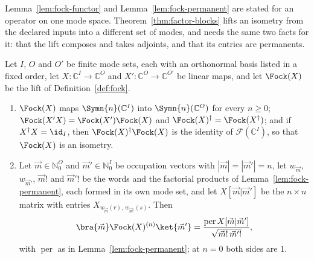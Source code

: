 
Lemma~\ref{lem:fock-functor} and Lemma~\ref{lem:fock-permanent} are stated for
an operator on one mode space. Theorem~\ref{thm:factor-blocks} lifts an
isometry from the declared inputs into a different set of modes, and needs the
same two facts for it: that the lift composes and takes adjoints, and that its
entries are permanents.

\begin{lemma}\label{lem:fock-permanent-maps}
Let $I$, $O$ and $O'$ be finite mode sets, each with an orthonormal basis
listed in a fixed order, let $X:\mathbb{C}^{I}\to\mathbb{C}^{O}$ and
$X':\mathbb{C}^{O}\to\mathbb{C}^{O'}$ be linear maps, and let $\Fock(X)$ be
the lift of Definition~\ref{def:fock}.
\begin{enumerate}[label=(\roman*),leftmargin=3.0em]
\item $\Fock(X)$ maps $\Symn{n}(\mathbb{C}^{I})$ into
  $\Symn{n}(\mathbb{C}^{O})$ for every $n\ge0$;
  $\Fock(X'X)=\Fock(X')\Fock(X)$ and $\Fock(X)^{\dagger}=\Fock(X^{\dagger})$;
  and if $X^{\dagger}X=\id_{I}$, then $\Fock(X)^{\dagger}\Fock(X)$ is the
  identity of $\mathcal{F}(\mathbb{C}^{I})$, so that $\Fock(X)$ is an
  isometry.
\item Let $\vec m\in\mathbb{N}_0^{O}$ and $\vec m'\in\mathbb{N}_0^{I}$ be
  occupation vectors with $|\vec m|=|\vec m'|=n$, let $w_{\vec m}$,
  $w_{\vec m'}$, $\vec m!$ and $\vec m'!$ be the words and the factorial
  products of Lemma~\ref{lem:fock-permanent}, each formed in its own mode set,
  and let $X[\vec m|\vec m']$ be the $n\times n$ matrix with entries
  $X_{w_{\vec m}(r),\,w_{\vec m'}(s)}$. Then
  \begin{equation}\label{eq:fock-permanent-maps}
    \bra{\vec m}\Fock(X)^{(n)}\ket{\vec m'}
    =\frac{\operatorname{per}X[\vec m|\vec m']}{\sqrt{\vec m!\,\vec m'!}} ,
  \end{equation}
  with $\operatorname{per}$ as in Lemma~\ref{lem:fock-permanent}; at $n=0$
  both sides are $1$.
\end{enumerate}
\end{lemma}

